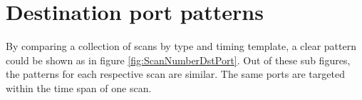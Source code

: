 \section{Destination port patterns}
\label{s:DestinationPortPatterns}
By comparing a collection of scans by type and timing template, a clear pattern could be shown as in figure \ref{fig:ScanNumberDstPort}.
Out of these sub figures, the patterns for each respective scan are similar. The same ports are targeted within the time span of one scan.

\begin{figure}[!ht]%
    \centering
    \\

\end{figure}
